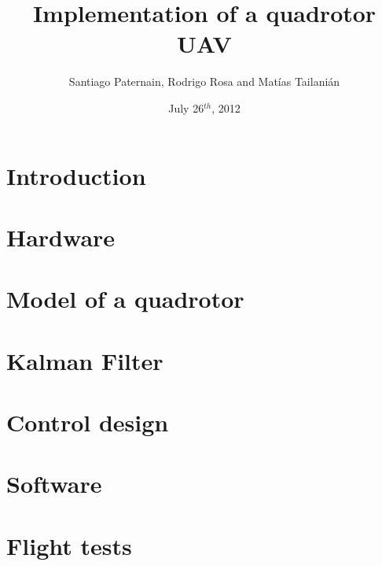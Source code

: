 \documentclass[10pt,a4paper,twoside,twocolumn]{article}
\begin{document}
\title{Implementation of a quadrotor UAV}
\author{Santiago Paternain, Rodrigo Rosa and Matías Tailanián }
\date{July 26$^{th}$, 2012}

\section{Introduction}

\section{Hardware}

\section{Model of a quadrotor}

\section{Kalman Filter}

\section{Control design}

\section{Software}

\section{Flight tests}
\end{document}
